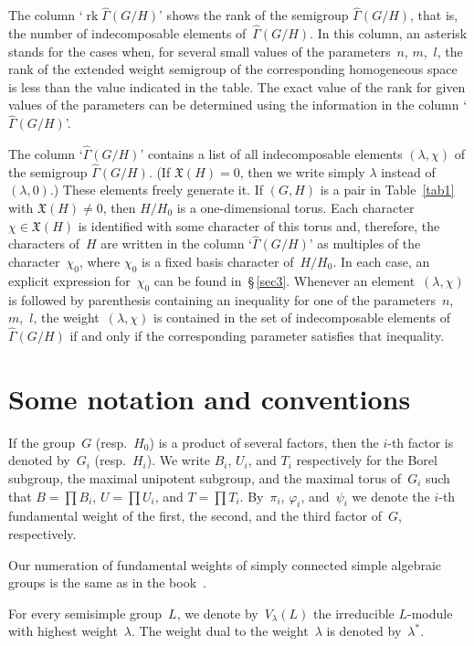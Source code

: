 \documentclass[12pt]{amsart}
\theoremstyle{definition}
\theoremstyle{remark}
\begin{document}
The column `${\operatorname{rk}} \widehat\Gamma(G/H)$' shows the rank of the
semigroup $\widehat\Gamma(G/H)$, that is, the number of
indecomposable elements of~$\widehat\Gamma(G/H)$. In this column, an
asterisk stands for the cases when, for several small values of the
parameters~$n$, $m$,~$l$, the rank of the extended weight semigroup
of the corresponding homogeneous space is less than the value
indicated in the table. The exact value of the rank for given values
of the parameters can be determined using the information in the
column `$\widehat\Gamma(G/H)$'.

The column `$\widehat\Gamma(G/H)$' contains a list of all
indecomposable elements $(\lambda,\chi)$ of the semigroup
$\widehat\Gamma(G/H)$. (If $\mathfrak{X}(H)=0$, then we write simply
$\lambda$ instead of $(\lambda,0)$.) These elements freely generate
it. If $(G,H)$ is a pair in Table~\ref{tab1} with
$\mathfrak{X}(H)\ne0$, then $H/H_0$ is a one-dimensional torus. Each
character $\chi\in\mathfrak{X}(H)$ is identified with some character
of this torus and, therefore, the characters of~$H$ are written in
the column `$\widehat\Gamma(G/H)$' as multiples of the
character~$\chi_0$, where $\chi_0$ is a fixed basis character
of~$H/H_0$. In each case, an explicit expression for~$\chi_0$ can be
found in~\S\,\ref{sec3}. Whenever an element~$(\lambda,\chi)$ is
followed by parenthesis containing an inequality for one of the
parameters~$n$, $m$,~$l$, the weight~$(\lambda,\chi)$ is contained
in the set of indecomposable elements of~$\widehat\Gamma(G/H)$ if
and only if the corresponding parameter satisfies that inequality.

\section*{Some notation and conventions}

If the group~$G$ (resp.~$H_0$) is a product of several factors, then
the $i$-th factor is denoted by~$G_i$ (resp.~$H_i$). We write $B_i$,
$U_i$, and $T_i$ respectively for the Borel subgroup, the maximal
unipotent subgroup, and the maximal torus of~$G_i$ such that
$B=\prod B_i$, $U=\prod U_i$, and $T=\prod T_i$. By~$\pi_i$,
$\varphi_i$, and~$\psi_i$ we denote the $i$-th fundamental weight of
the first, the second, and the third factor of~$G$, respectively.

Our numeration of fundamental weights of simply connected simple
algebraic groups is the same as in the book~\cite{13}.

For every semisimple group~$L$, we denote by~$V_\lambda(L)$ the
irreducible $L$-module with highest weight~$\lambda$. The weight
dual to the weight~$\lambda$ is denoted by~$\lambda^*$.
\end{document}
